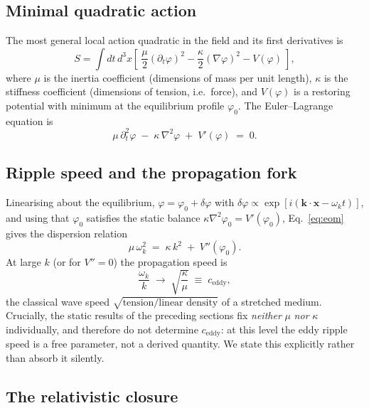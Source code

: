 \subsection{Minimal quadratic action}

The most general local action quadratic in the field and its first derivatives is
\begin{equation}
S = \int \! dt\,d^3x
\left[\ \frac{\mu}{2}\left(\partial_t\varphi\right)^2
      - \frac{\kappa}{2}\left(\nabla\varphi\right)^2
      - V(\varphi)\ \right],
\label{eq:action}
\end{equation}
where $\mu$ is the inertia coefficient (dimensions of mass per unit length),
$\kappa$ is the stiffness coefficient (dimensions of tension, i.e.\ force), and
$V(\varphi)$ is a restoring potential with minimum at the equilibrium profile
$\varphi_0$. The Euler--Lagrange equation is
\begin{equation}
\mu\,\partial_t^2\varphi \;-\; \kappa\,\nabla^2\varphi \;+\; V'(\varphi) \;=\; 0 .
\label{eq:eom}
\end{equation}

\subsection{Ripple speed and the propagation fork}

Linearising about the equilibrium, $\varphi = \varphi_0 + \delta\varphi$ with
$\delta\varphi \propto \exp[i(\mathbf{k}\cdot\mathbf{x} - \omega_k t)]$, and using that
$\varphi_0$ satisfies the static balance $\kappa\nabla^2\varphi_0 = V'(\varphi_0)$,
Eq.~\eqref{eq:eom} gives the dispersion relation
\begin{equation}
\mu\,\omega_k^2 \;=\; \kappa\,k^2 \;+\; V''(\varphi_0).
\label{eq:disp_general}
\end{equation}
At large $k$ (or for $V''=0$) the propagation speed is
\begin{equation}
\frac{\omega_k}{k} \;\longrightarrow\; \sqrt{\frac{\kappa}{\mu}} \;\equiv\; c_\text{eddy},
\label{eq:speed}
\end{equation}
the classical wave speed $\sqrt{\text{tension}/\text{linear density}}$ of a stretched
medium. Crucially, the static results of the preceding sections fix \emph{neither}
$\mu$ \emph{nor} $\kappa$ individually, and therefore do not determine
$c_\text{eddy}$: at this level the eddy ripple speed is a free parameter, not a
derived quantity. We state this explicitly rather than absorb it silently.

\subsection{The relativistic closure}

